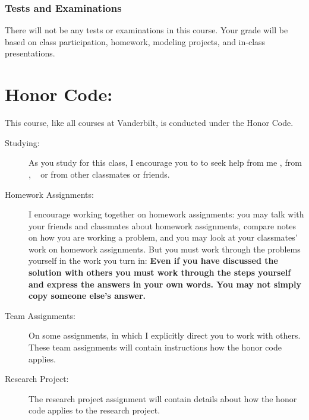 \documentclass[11pt,twoside]{jgsyllabus}\usepackage[]{graphicx}\usepackage[]{xcolor}
\begin{document}
\subsubsection{Tests and Examinations}
There will not be any tests or examinations in this course. Your grade will be
based on class participation, homework, modeling projects, and in-class
presentations.

%
%

\section{Honor Code:}
This course, like all courses at Vanderbilt, is conducted under the Honor Code.
\begin{description}
\item[Studying:] As you study for this class, I encourage you to to seek help from me%
\ifTA
, from \TaTitle,
\else
\
\fi
or from other classmates or friends.

\item[Homework Assignments:] I encourage working together
on homework assignments: you may talk with your friends and classmates about
homework assignments, compare notes on how you are working a problem, and you
may look at your classmates' work on homework assignments.
But you must work through the problems yourself
in the work you turn in:
\textbf{Even if you have discussed the solution with others you must work
through the steps yourself and express the answers in your own words. You may
not simply copy someone else's answer.}

\item[Team Assignments:] On some assignments, in which I explicitly direct you
to work with others.
These team assignments will contain instructions how the honor code applies.

\item[Research Project:] The research project assignment will contain details
about how the honor code applies to the research project.

\end{description}
\end{document}
